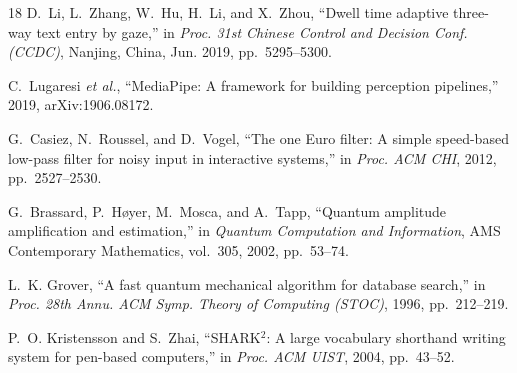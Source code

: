 \documentclass[conference]{IEEEtran}
\begin{document}
\begin{thebibliography}{18}
D.~Li, L.~Zhang, W.~Hu, H.~Li, and X.~Zhou, ``Dwell time adaptive three-way
text entry by gaze,'' in \emph{Proc. 31st Chinese Control and Decision Conf.
(CCDC)}, Nanjing, China, Jun. 2019, pp.~5295--5300.

C.~Lugaresi \emph{et al.}, ``MediaPipe: A framework for building perception
pipelines,'' 2019, arXiv:1906.08172.

G.~Casiez, N.~Roussel, and D.~Vogel, ``The one Euro filter: A simple
speed-based low-pass filter for noisy input in interactive systems,'' in
\emph{Proc. ACM CHI}, 2012, pp.~2527--2530.

G.~Brassard, P.~H{\o}yer, M.~Mosca, and A.~Tapp, ``Quantum amplitude
amplification and estimation,'' in \emph{Quantum Computation and Information},
AMS Contemporary Mathematics, vol.~305, 2002, pp.~53--74.

L.~K. Grover, ``A fast quantum mechanical algorithm for database search,'' in
\emph{Proc. 28th Annu. ACM Symp. Theory of Computing (STOC)}, 1996,
pp.~212--219.

P.~O. Kristensson and S.~Zhai, ``SHARK$^2$: A large vocabulary shorthand
writing system for pen-based computers,'' in \emph{Proc. ACM UIST}, 2004,
pp.~43--52.

\end{thebibliography}
\end{document}

